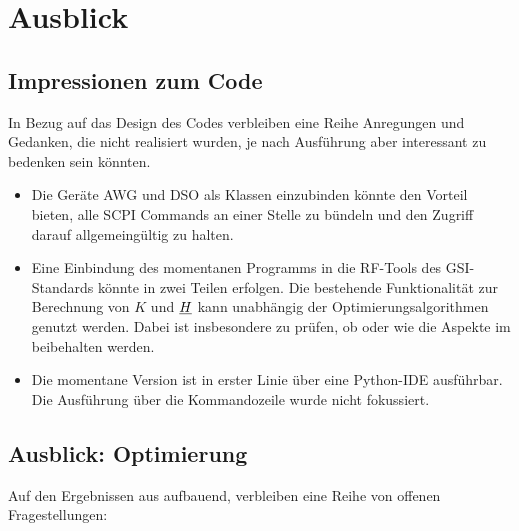 \documentclass[../Report.tex]{subfiles}
\begin{document}
\chapter{Ausblick}
\label{chap:ausb}

\section{Impressionen zum Code}
\label{sec:ausb.code}
In Bezug auf das Design des Codes verbleiben eine Reihe Anregungen und Gedanken, die nicht realisiert wurden, je nach Ausführung aber interessant zu bedenken sein könnten.

\begin{itemize}
	\item	Die Geräte AWG und DSO als Klassen einzubinden könnte den Vorteil bieten, alle SCPI Commands an einer Stelle zu bündeln und den Zugriff darauf allgemeingültig zu halten.
	
	\item	Eine Einbindung des momentanen Programms in die RF-Tools des GSI-Standards könnte in zwei Teilen erfolgen. Die bestehende Funktionalität zur Berechnung von $K$ und $\underline{H}$ kann unabhängig der Optimierungsalgorithmen genutzt werden. Dabei ist insbesondere zu prüfen, ob oder wie die Aspekte im  beibehalten werden. 
	
	\item 	Die momentane Version ist in erster Linie über eine Python-IDE ausführbar. Die Ausführung über die Kommandozeile wurde nicht fokussiert.
	
\end{itemize}





\section{Ausblick: Optimierung}
\label{sec:ausb.opti}

Auf den Ergebnissen aus  aufbauend, verbleiben eine Reihe von offenen Fragestellungen:
\end{document}
